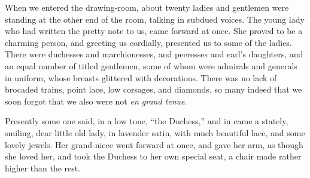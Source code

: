 \documentclass[12pt]{book}
\begin{document}
When we entered the drawing‐room, about twenty ladies and gentlemen were
standing at the other end of the room, talking in subdued voices. The young lady
who had written the pretty note to us, came forward at once. She proved to be a
charming person, and greeting us cordially, presented us to some of the ladies.
There were duchesses and marchionesses, and peeresses and earl’s daughters,
and an equal number of titled gentlemen, some of whom were admirals and
generals in uniform, whose breasts glittered with decorations. There was no lack
of brocaded trains, point lace, low corsages, and diamonds, so many indeed that
we soon forgot that we also were not {\it en grand tenue}.

Presently some one said, in a low tone, “the Duchess,” and in came a stately,
smiling, dear little old lady, in lavender satin, with much beautiful lace, and some
lovely jewels. Her grand‐niece went forward at once, and gave her arm, as though
she loved her, and took the Duchess to her own special seat, a chair made rather
higher than the rest.
\end{document}

